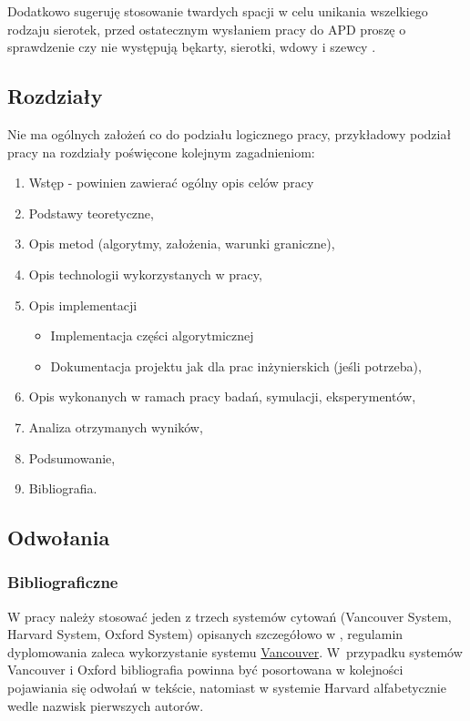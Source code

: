 \documentclass[12pt,a4paper]{article}
\begin{document}
Dodatkowo sugeruję stosowanie twardych spacji w celu unikania wszelkiego rodzaju sierotek, przed ostatecznym wysłaniem pracy do APD proszę o sprawdzenie czy nie występują  bękarty, sierotki, wdowy i szewcy \cite{Bekart}.

\subsection{Rozdziały}
Nie ma ogólnych założeń co do podziału logicznego pracy, przykładowy podział pracy na rozdziały poświęcone kolejnym zagadnieniom:
\begin{enumerate}
\item Wstęp - powinien zawierać ogólny opis celów pracy
\item Podstawy teoretyczne, 
\item Opis metod (algorytmy, założenia, warunki graniczne), 
\item Opis technologii wykorzystanych w pracy,
\item Opis implementacji 
\begin{itemize}
\item Implementacja części algorytmicznej
\item Dokumentacja projektu jak dla prac inżynierskich (jeśli potrzeba),
\end{itemize}
\item Opis wykonanych w ramach pracy badań, symulacji, eksperymentów,
\item Analiza otrzymanych wyników,
\item Podsumowanie,
\item Bibliografia.
\end{enumerate}

\subsection{Odwołania}

\subsubsection{Bibliograficzne}
W pracy należy stosować jeden z trzech systemów cytowań (Vancouver System, Harvard System, Oxford System) opisanych szczegółowo w \cite{Cytowanie}, regulamin dyplomowania zaleca wykorzystanie systemu \underline{Vancouver}. W~przypadku systemów Vancouver i Oxford bibliografia powinna być posortowana w kolejności pojawiania się odwołań w tekście, natomiast w systemie Harvard alfabetycznie wedle nazwisk pierwszych autorów.
\end{document}
